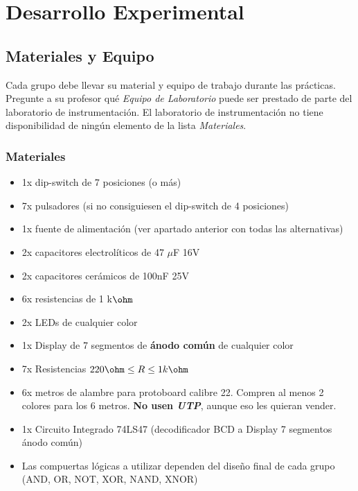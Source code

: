

\pagebreak

\section{Desarrollo Experimental}
\subsection{Materiales y Equipo}

Cada grupo debe llevar su material y equipo de trabajo durante las prácticas. Pregunte a su profesor qué \emph{Equipo de Laboratorio} puede ser prestado
de parte del laboratorio de instrumentación. El laboratorio de instrumentación no tiene disponibilidad de ningún elemento de la lista \emph{Materiales}.

\subsubsection*{Materiales}
\begin{itemize}
    \item 1x dip-switch de 7 posiciones (o más)
    \item 7x pulsadores (si no consiguiesen el dip-switch de 4 posiciones)
    \item 1x fuente de alimentación (ver apartado anterior con todas las alternativas)
    \item 2x capacitores electrolíticos de 47 $\mu$F 16V
    \item 2x capacitores cerámicos de 100nF 25V
    \item 6x resistencias de 1 k$\ohm$
    \item 2x LEDs de cualquier color
    \item 1x Display de 7 segmentos de \textbf{ánodo común} de cualquier color
    \item 7x Resistencias $220 \ohm \leq R \leq 1 k\ohm$
    \item 6x metros de alambre para protoboard calibre 22. Compren al menos 2 colores para los 6 metros. \textbf{No usen \emph{UTP}}, aunque eso les quieran vender.
    \item 1x Circuito Integrado 74LS47 (decodificador BCD a Display 7 segmentos ánodo común)
    \item Las compuertas lógicas a utilizar dependen del diseño final de cada grupo (AND, OR, NOT, XOR, NAND, XNOR)
\end{itemize}


